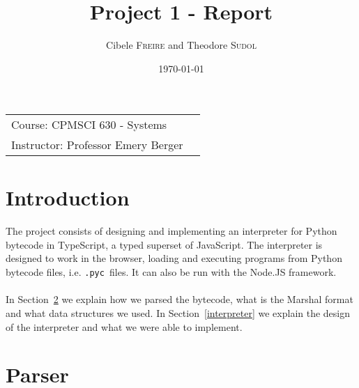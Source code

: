 \documentclass{article}
\title{Project 1 - Report} %
\author{Cibele \textsc{Freire} and Theodore \textsc{Sudol}} %
\date{\today} %
\newcommand{\pyc}{\texttt{.pyc~}}
\begin{document}

\maketitle %

\begin{center}
\begin{tabular}{l r}
Course: CPMSCI 630 - Systems \\
Instructor: Professor Emery Berger %
\end{tabular}
\end{center}





\section{Introduction}\label{intro}

\paragraph{}
The project consists of designing and implementing an interpreter for Python bytecode in TypeScript, a typed superset of JavaScript. The interpreter is designed to work in the browser, loading and executing programs from Python bytecode files, i.e. \pyc files. It can also be run with the Node.JS framework.

\paragraph{}
In Section~\ref{parser} we explain how we parsed the bytecode, what is the Marshal format and what data structures we used. In Section~\ref{interpreter} we explain the design of the interpreter and what we were able to implement.

\section{Parser}\label{parser}
\end{document}
